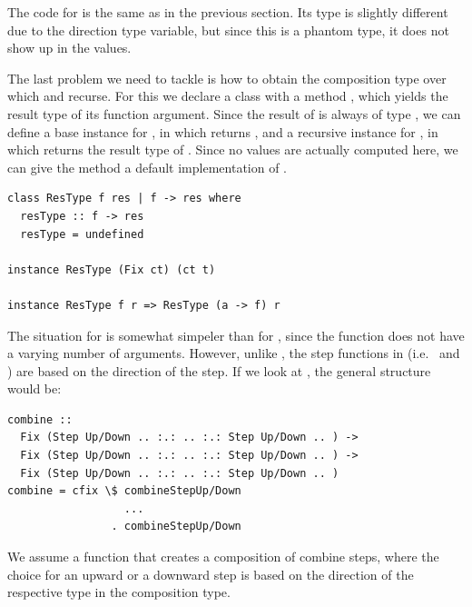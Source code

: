 \documentclass[preprint,natbib]{sigplanconf}
\begin{document}
The code for  is the same as in the previous section. Its type is slightly different due to the direction type variable, but since this is a phantom type, it does not show up in the values. 

The last problem we need to tackle is how to obtain the composition type over which  and  recurse. For this we declare a class  with a method , which yields the result type of its function argument. Since the result of  is always of type , we can define a base instance for , in which  returns , and a recursive instance for , in which  returns the result type of . Since no values are actually computed here, we can give the method a default implementation of .


\begin{small}
\begin{verbatim}
class ResType f res | f -> res where
  resType :: f -> res
  resType = undefined

instance ResType (Fix ct) (ct t)
  
instance ResType f r => ResType (a -> f) r
\end{verbatim}
\end{small}




The situation for  is somewhat simpeler than for , since the function does not have a varying number of arguments. However, unlike , the step functions in   (i.e.\  and ) are based on the direction of the step. If we look at , the general structure would be:

\begin{small}
\begin{verbatim}
combine :: 
  Fix (Step Up/Down .. :.: .. :.: Step Up/Down .. ) ->
  Fix (Step Up/Down .. :.: .. :.: Step Up/Down .. ) ->
  Fix (Step Up/Down .. :.: .. :.: Step Up/Down .. )
combine = cfix \$ combineStepUp/Down 
                  ...
                . combineStepUp/Down 
\end{verbatim}%
\end{small}

We assume a function that creates a composition of  combine steps, where the choice for an upward or a downward step is based on the direction of the respective  type in the composition type.
\end{document}
